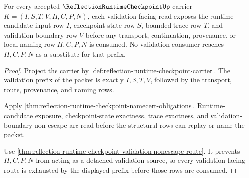 \begin{theorem}
\label{thm:reflection-runtime-checkpoint-validation-prefix-exhaustion}
For every accepted $\ReflectionRuntimeCheckpointUp$ carrier $K=(I,S,T,V,H,C,P,N)$, each validation-facing read exposes the runtime-candidate input row $I$, checkpoint-state row $S$, bounded trace row $T$, and validation-boundary row $V$ before any transport, continuation, provenance, or local naming row $H,C,P,N$ is consumed. No validation consumer reaches $H,C,P,N$ as a substitute for that prefix.
\end{theorem}
\begin{proof}
Project the carrier by \autoref{def:reflection-runtime-checkpoint-carrier}. The validation prefix of the packet is exactly $I,S,T,V$, followed by the transport, route, provenance, and naming rows.

Apply \autoref{thm:reflection-runtime-checkpoint-namecert-obligations}. Runtime-candidate exposure, checkpoint-state exactness, trace exactness, and validation-boundary non-escape are read before the structural rows can replay or name the packet.

Use \autoref{thm:reflection-runtime-checkpoint-validation-nonescape-route}. It prevents $H,C,P,N$ from acting as a detached validation source, so every validation-facing route is exhausted by the displayed prefix before those rows are consumed.
\end{proof}

